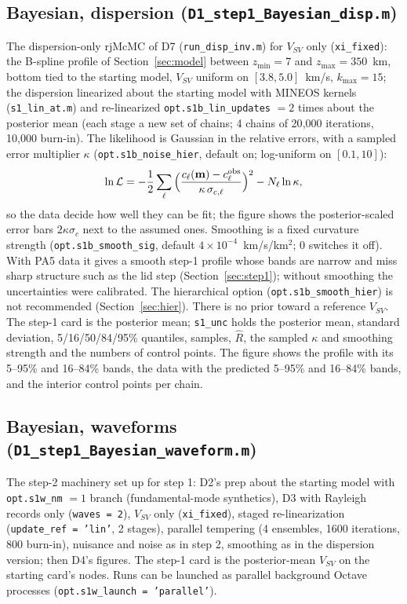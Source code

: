 \documentclass[11pt]{article}
\newcommand{\vsv}{V_{SV}}
\begin{document}
\subsection{Bayesian, dispersion (\texttt{D1\_step1\_Bayesian\_disp.m})}
The dispersion-only rjMcMC of D7 (\texttt{run\_disp\_inv.m}) for $\vsv$ only
(\texttt{xi\_fixed}): the B-spline profile of Section~\ref{sec:model}
between $z_{\min}=7$ and $z_{\max}=350$~km, bottom tied to the starting
model, $\vsv$ uniform on $[3.8,5.0]$~km/s, $k_{\max}=15$; the dispersion
linearized about the starting model with MINEOS kernels
(\texttt{s1\_lin\_at.m}) and re-linearized \texttt{opt.s1b\_lin\_updates}
$=2$ times about the posterior mean (each stage a new set of chains; 4
chains of 20{,}000 iterations, 10{,}000 burn-in). The likelihood is
Gaussian in the relative errors, with a sampled error multiplier $\kappa$
(\texttt{opt.s1b\_noise\_hier}, default on; log-uniform on $[0.1,10]$):
\begin{equation}
 \ln\mathcal{L}=-\frac12\sum_\ell\Big(\frac{c_\ell(\mathbf{m})-c^{\rm obs}_\ell}{\kappa\,\sigma_{c,\ell}}\Big)^2-N_\ell\ln\kappa ,
\end{equation}
so the data decide how well they can be fit; the figure shows the
posterior-scaled error bars $2\kappa\sigma_c$ next to the assumed ones.
Smoothing is a fixed curvature strength (\texttt{opt.s1b\_smooth\_sig},
default $4\times10^{-4}$~km/s/km$^2$; 0 switches it off). With PA5 data it
gives a smooth step-1 profile whose bands are narrow and miss sharp
structure such as the lid step (Section~\ref{sec:step1}); without
smoothing the uncertainties were calibrated. The hierarchical option
(\texttt{opt.s1b\_smooth\_hier}) is not recommended (Section~\ref{sec:hier}). There is no prior toward a
reference $\vsv$. The step-1 card is the
posterior mean; \texttt{s1\_unc} holds the posterior mean, standard
deviation, 5/16/50/84/95\% quantiles, samples, $\hat R$, the sampled
$\kappa$ and smoothing strength and the numbers of control points. The
figure shows the profile with its 5--95\% and 16--84\% bands, the data
with the predicted 5--95\% and 16--84\% bands, and the interior control
points per chain.

\subsection{Bayesian, waveforms (\texttt{D1\_step1\_Bayesian\_waveform.m})}
The step-2 machinery set up for step 1: D2's prep about the starting
model with \texttt{opt.s1w\_nm} $=1$ branch (fundamental-mode synthetics),
D3 with Rayleigh records only (\texttt{waves = 2}), $\vsv$ only
(\texttt{xi\_fixed}), staged re-linearization (\texttt{update\_ref = 'lin'},
2 stages), parallel tempering (4 ensembles, 1600 iterations, 800 burn-in),
nuisance and noise as in step 2, smoothing as in the dispersion version; then
D4's figures. The step-1 card is the posterior-mean $\vsv$ on the starting
card's nodes. Runs can be launched as parallel background Octave processes
(\texttt{opt.s1w\_launch = 'parallel'}).
\end{document}
